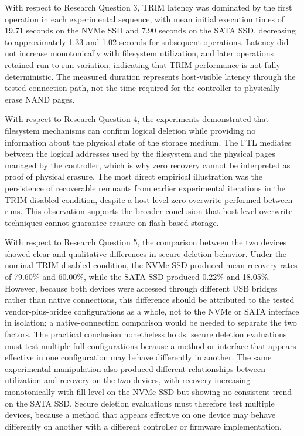 With respect to Research Question 3, TRIM latency was dominated by the first operation in each experimental sequence, with mean initial execution times of 19.71 seconds 
on the NVMe SSD and 7.90 seconds on the SATA SSD, decreasing to approximately 1.33 and 1.02 seconds for subsequent operations. Latency did not increase monotonically 
with filesystem utilization, and later operations retained run-to-run variation, indicating that TRIM performance is not fully deterministic. The measured duration 
represents host-visible latency through the tested connection path, not the time required for the controller to physically erase NAND pages.

With respect to Research Question 4, the experiments demonstrated that filesystem mechanisms can confirm logical deletion while providing no information about the 
physical state of the storage medium. The FTL mediates between the logical addresses used by the filesystem and the physical pages managed by the controller, which is 
why zero recovery cannot be interpreted as proof of physical erasure. The most direct empirical illustration was the persistence of recoverable remnants from earlier 
experimental iterations in the TRIM-disabled condition, despite a host-level zero-overwrite performed between runs. This observation supports the broader conclusion 
that host-level overwrite techniques cannot guarantee erasure on flash-based storage.

With respect to Research Question 5, the comparison between the two devices showed clear and qualitative differences in secure deletion behavior. Under the nominal 
TRIM-disabled condition, the NVMe SSD produced mean recovery rates of 79.60\% and 60.00\%, while the SATA SSD produced 0.22\% and 18.05\%. However, because both devices 
were accessed through different USB bridges rather than native connections, this difference should be attributed to the tested vendor-plus-bridge configurations as a 
whole, not to the NVMe or SATA interface in isolation; a native-connection comparison would be needed to separate the two factors. The practical conclusion nonetheless 
holds: secure deletion evaluations must test multiple full configurations because a method or interface that appears effective in one configuration may behave differently 
in another. The same experimental manipulation also produced different relationships between utilization and recovery on the two devices, with recovery increasing 
monotonically with fill level on the NVMe SSD but showing no consistent trend on the SATA SSD. Secure deletion evaluations must therefore test multiple devices, because 
a method that appears effective on one device may behave differently on another with a different controller or firmware implementation.

